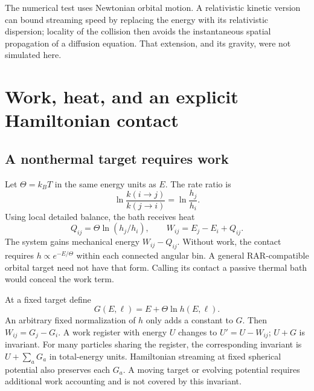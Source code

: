 \documentclass[11pt]{article}
\begin{document}
The numerical test uses Newtonian orbital motion. A relativistic kinetic
version can bound streaming speed by replacing the energy with its
relativistic dispersion; locality of the collision then avoids the
instantaneous spatial propagation of a diffusion equation. That extension,
and its gravity, were not simulated here.

\section{Work, heat, and an explicit Hamiltonian contact}
\subsection{A nonthermal target requires work}
Let $\Theta=k_BT$ in the same energy units as $E$. The rate ratio is
\begin{equation}
 \ln\frac{k(i\to j)}{k(j\to i)}=\ln\frac{h_j}{h_i}.
\end{equation}
Using local detailed balance\cite{Seifert}, the bath receives heat
\begin{equation}\label{eq:heat}
 Q_{ij}=\Theta\ln(h_j/h_i),\qquad
 W_{ij}=E_j-E_i+Q_{ij}.
\end{equation}
The system gains mechanical energy $W_{ij}-Q_{ij}$.
Without work, the contact requires $h\propto e^{-E/\Theta}$ within each
connected angular bin. A general RAR-compatible orbital target need not
have that form. Calling its contact a passive thermal bath would conceal
the work term.

At a fixed target define
\begin{equation}
 G(E,\ell)=E+\Theta\ln h(E,\ell).
\end{equation}
An arbitrary fixed normalization of $h$ only adds a constant to $G$.
Then $W_{ij}=G_j-G_i$. A work register with energy $U$ changes to
$U'=U-W_{ij}$; $U+G$ is invariant. For many particles sharing the register,
the corresponding invariant is $U+\sum_aG_a$ in total-energy units.
Hamiltonian streaming at fixed spherical potential also preserves each
$G_a$. A moving target or evolving potential requires additional work
accounting and is not covered by this invariant.
\end{document}
